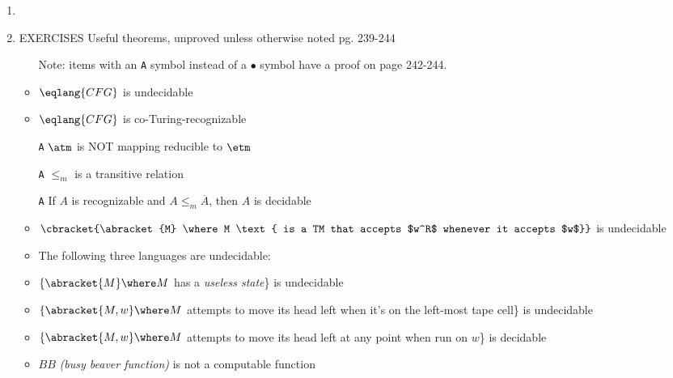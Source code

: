 \documentclass[12pt]{article} %
\newcommand{\theoremitem}[3]{\item #1 \quad #2 \dotfill #3}
\newenvironment{theoremlist} {
    \begin{enumerate}[nosep,leftmargin=*,label={}]
} {
    \end{enumerate}
}
\begin{document}
\begin{theoremlist}
    \item[]
    \theoremitem{EXERCISES}
    {Useful theorems, unproved unless otherwise noted}
    {pg. 239-244}
    \begin{itemize}[nosep]
        \item[] Note: items with an \texttt{A} symbol instead of a $\bullet$ symbol have a proof on page 242-244.
        \item $\eqlang{CFG}$ is undecidable
        \item $\eqlang{CFG}$ is co-Turing-recognizable
        \item[\texttt{A}] $\atm$ is NOT mapping reducible to $\etm$
        \item[\texttt{A}] $\leq_m$ is a transitive relation
        \item[\texttt{A}] If $A$ is recognizable and $A\leq_m\overline{A}$, then $A$ is decidable
        \item $\cbracket{\abracket{M} \where M \text{ is a TM that accepts $w^R$ whenever it accepts $w$}}$ is undecidable
        \vspace{0.25em}
        \item The following three languages are undecidable:
        \item $\{\abracket{M} \where M$ has a \textit{useless state}\} is undecidable
        \item $\{\abracket{M,w} \where M$ attempts to move its head left when it's on the left-most tape cell\} is undecidable
        \item $\{\abracket{M,w} \where M$ attempts to move its head left at any point when run on $w$\} is decidable
        \item $BB$ \textit{(busy beaver function)} is not a computable function

\end{itemize}
\end{theoremlist}
\end{document}
